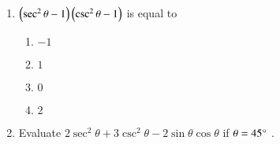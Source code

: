 \begin{enumerate}[label=\thesubsection.\arabic*,ref=\thesubsection.\theenumi,itemsep=1pt]
\begin{multicols}{4}
\begin{enumerate}
\item $\frac{1}{\sqrt{13}}$
\item $3$
\item does not exist
\end{enumerate}
\end{multicols}
%
    \hfill{}\item $\left(\sec^2\theta - 1\right)\left(\csc^2\theta - 1\right)$  is equal to
    \begin{multicols}{4}
\begin{enumerate}
   \item $-1$
   \item  $1$
   \item  $0$
   \item  $2$
        \end{enumerate}
\end{multicols}
   \hfill{}\item Evaluate $2\sec^2\theta+3\csc^2\theta-2\sin\theta\cos\theta$ if
      $\theta=45\degree$
   .
   

\end{enumerate}
